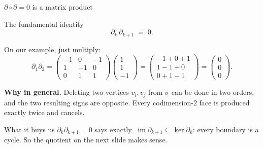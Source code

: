 \documentclass[10pt,aspectratio=169]{beamer}
\newcommand{\im}{\operatorname{im}}
\newcommand{\HL}[1]{\textcolor{blue!70!black}{#1}}
\begin{document}
    \begin{frame}[shrink=8]{$\partial\circ\partial=0$ is a matrix product}
        \begin{block}{The fundamental identity}
            \[
                \partial_k\,\partial_{k+1}\;=\;0.
            \]
        \end{block}

        On our example, just multiply:
        \[
            \partial_1\partial_2=
            \begin{pmatrix}
                -1&0&-1\\ 1&-1&0\\ 0&1&1
            \end{pmatrix}
            \begin{pmatrix}
                1\\ 1\\ -1
            \end{pmatrix}
            =\begin{pmatrix}
                 -1+0+1\\ 1-1+0\\ 0+1-1
            \end{pmatrix}
            =\begin{pmatrix}
                 0\\0\\0
            \end{pmatrix}.
        \]

        \vspace{0.3em}
        \textbf{Why in general.} Deleting two vertices $v_i,v_j$ from $\sigma$ can be done in
        two orders, and the two resulting signs are opposite. Every codimension-$2$ face is
        produced exactly twice and cancels.

        \vspace{0.5em}
        \begin{alertblock}{What it buys us}
            $\partial_k\partial_{k+1}=0$ says exactly
            $\ \im\partial_{k+1}\subseteq\ker\partial_k$: \HL{every boundary is a cycle.}
            So the quotient on the next slide makes sense.
        \end{alertblock}
    \end{frame}
\end{document}
